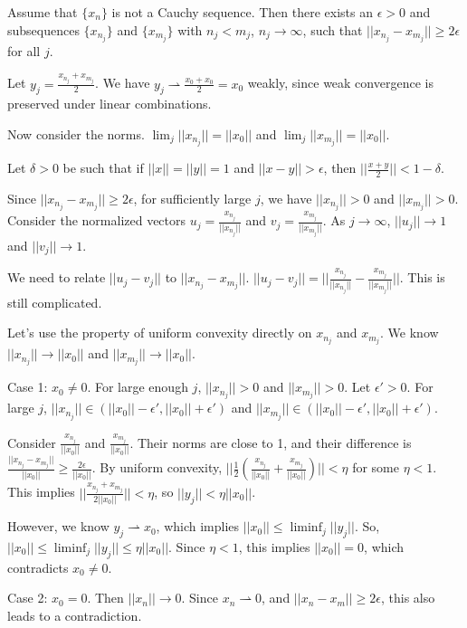Assume that $\{x_n\}$ is not a Cauchy sequence. Then there exists an $\epsilon > 0$ and subsequences $\{x_{n_j}\}$ and $\{x_{m_j}\}$ with $n_j < m_j$, $n_j \to \infty$, such that $||x_{n_j} - x_{m_j}|| \ge 2\epsilon$ for all $j$.

Let $y_j = \frac{x_{n_j} + x_{m_j}}{2}$.
We have $y_j \rightharpoonup \frac{x_0 + x_0}{2} = x_0$ weakly, since weak convergence is preserved under linear combinations.

Now consider the norms.
$\lim_j ||x_{n_j}|| = ||x_0||$ and $\lim_j ||x_{m_j}|| = ||x_0||$.

Let $\delta > 0$ be such that if $||x|| = ||y|| = 1$ and $||x - y|| > \epsilon$, then $||\frac{x + y}{2}|| < 1 - \delta$.

Since $||x_{n_j} - x_{m_j}|| \ge 2\epsilon$, for sufficiently large $j$, we have $||x_{n_j}|| > 0$ and $||x_{m_j}|| > 0$.
Consider the normalized vectors $u_j = \frac{x_{n_j}}{||x_{n_j}||}$ and $v_j = \frac{x_{m_j}}{||x_{m_j}||}$.
As $j \to \infty$, $||u_j|| \to 1$ and $||v_j|| \to 1$.

We need to relate $||u_j - v_j||$ to $||x_{n_j} - x_{m_j}||$.
$||u_j - v_j|| = ||\frac{x_{n_j}}{||x_{n_j}||} - \frac{x_{m_j}}{||x_{m_j}||}||$. This is still complicated.

Let's use the property of uniform convexity directly on $x_{n_j}$ and $x_{m_j}$.
We know $||x_{n_j}|| \to ||x_0||$ and $||x_{m_j}|| \to ||x_0||$.

Case 1: $x_0 \neq 0$. For large enough $j$, $||x_{n_j}|| > 0$ and $||x_{m_j}|| > 0$.
Let $\epsilon' > 0$. For large $j$, $||x_{n_j}|| \in (||x_0|| - \epsilon', ||x_0|| + \epsilon')$ and $||x_{m_j}|| \in (||x_0|| - \epsilon', ||x_0|| + \epsilon')$.

Consider $\frac{x_{n_j}}{||x_0||}$ and $\frac{x_{m_j}}{||x_0||}$. Their norms are close to 1, and their difference is $\frac{||x_{n_j} - x_{m_j}||}{||x_0||} \ge \frac{2\epsilon}{||x_0||}$.
By uniform convexity, $||\frac{1}{2} (\frac{x_{n_j}}{||x_0||} + \frac{x_{m_j}}{||x_0||})|| < \eta$ for some $\eta < 1$.
This implies $||\frac{x_{n_j} + x_{m_j}}{2||x_0||}|| < \eta$, so $||y_j|| < \eta ||x_0||$.

However, we know $y_j \rightharpoonup x_0$, which implies $||x_0|| \le \liminf_j ||y_j||$.
So, $||x_0|| \le \liminf_j ||y_j|| \le \eta ||x_0||$.
Since $\eta < 1$, this implies $||x_0|| = 0$, which contradicts $x_0 \neq 0$.

Case 2: $x_0 = 0$. Then $||x_n|| \to 0$. Since $x_n \rightharpoonup 0$, and $||x_n - x_m|| \ge 2\epsilon$, this also leads to a contradiction.

